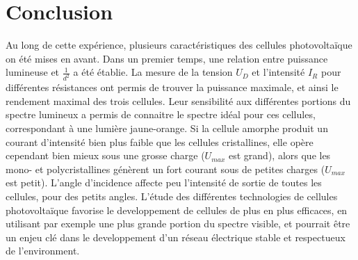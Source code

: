 \section{Conclusion}

Au long de cette expérience, plusieurs caractéristiques des cellules photovoltaïque on été mises en avant.
Dans un premier temps, une relation entre puissance lumineuse et \(\frac{1}{d^2}\) a été établie. La mesure de la tension \(U_D\) et l'intensité \(I_R\) pour différentes résistances ont permis de trouver la puissance maximale, et ainsi le rendement maximal des trois cellules. Leur sensibilité aux différentes portions du spectre lumineux a permis de connaitre le spectre idéal pour ces cellules, correspondant à une lumière jaune-orange.
Si la cellule amorphe produit un courant d'intensité bien plus faible que les cellules cristallines, elle opère cependant bien mieux sous une grosse charge (\(U_{max}\) est grand), alors que les mono- et polycristallines génèrent un fort courant sous de petites charges (\(U_{max}\) est petit).
L'angle d'incidence affecte peu l'intensité de sortie de toutes les cellules, pour des petits angles.
L'étude des différentes technologies de cellules photovoltaïque favorise le developpement de cellules de plus en plus efficaces, en utilisant par exemple une plus grande portion du spectre visible, et pourrait être un enjeu clé dans le developpement d'un réseau électrique stable et respectueux de l'environment.


